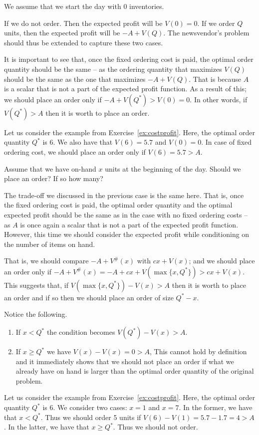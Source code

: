 \begin{solution}
We assume that we start the day with 0 inventories. 

If we do not order. Then the expected profit will be $V(0)=0$. If we order $Q$ units, then the expected profit will be $-A+V(Q)$. The newsvendor's problem should thus be extended to capture these two cases. 

It is important to see that, once the fixed ordering cost is paid, the optimal order quantity should be the same -- as the ordering quantity that maximizes $V(Q)$ should be the same as the one that maximizes $-A+V(Q)$. That is because $A$ is a scalar that is not a part of the expected profit function. As a result of this; we should place an order only if $-A+V(Q^*)>V(0)=0$. In other words, if $V(Q^*)>A$ then it is worth to place an order. 

Let us consider the example from Exercise~\ref{ex:costprofit}. Here, the optimal order quantity $Q^*$ is 6. We also have that $V(6)=5.7$ and $V(0)=0$. In case of fixed ordering cost, we should place an order only if $V(6)=5.7 > A$. 
\end{solution}

\begin{question}
Assume that we have on-hand $x$ units at the beginning of the day. Should we place an order? If so how many?
\end{question}

\begin{solution}
The trade-off we discussed in the previous case is the same here. That is, once the fixed ordering cost is paid, the optimal order quantity and the optimal expected profit should be the same as in the case with no fixed ordering costs -- as $A$ is once again a scalar that is not a part of the expected profit function. However, this time we should consider the expected profit while conditioning on the number of items on hand. 

That is, we should compare $-A+V^\#(x)$ with $cx+V(x)$; and we should place an order only if $-A+V^\#(x)=-A+cx+V(\max\{x,Q^*\})>cx+V(x)$. This suggests that, if $V(\max\{x,Q^*\})-V(x)>A$ then it is worth to place an order and if so then we should place an order of size $Q^*-x$.

Notice the following.
\begin{enumerate}
\item If $x<Q^*$ the condition becomes $V(Q^*)-V(x)>A$.
\item If $x\geq Q^*$ we have $V(x)-V(x)=0>A$, This cannot hold by definition and it immediately shows that we should not place an order if what we already have on hand is larger than the optimal order quantity of the original problem.
\end{enumerate}

Let us consider the example from Exercise~\ref{ex:costprofit}. Here, the optimal order quantity $Q^*$ is 6. We consider two cases: $x=1$ and $x=7$. In the former, we have that $x<Q^*$. Thus we should order 5 units if $V(6)-V(1)=5.7-1.7=4>A$. In the latter, we have that $x\geq Q^*$. Thus we should not order.
\end{solution}



